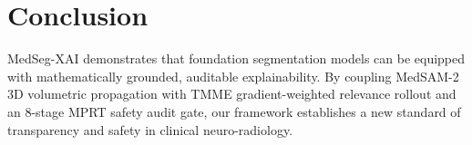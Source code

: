 \documentclass[journal,10pt,twocolumn]{IEEEtran}
\begin{document}
\section{Conclusion}
MedSeg-XAI demonstrates that foundation segmentation models can be equipped with mathematically grounded, auditable explainability. By coupling MedSAM-2 3D volumetric propagation with TMME gradient-weighted relevance rollout and an 8-stage MPRT safety audit gate, our framework establishes a new standard of transparency and safety in clinical neuro-radiology.



\end{document}

